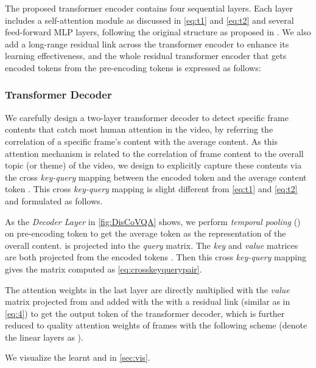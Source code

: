 \documentclass[journal]{IEEEtran}
\begin{document}
The proposed transformer encoder  contains four sequential layers. Each layer includes a self-attention module as discussed in \cref{eq:t1} and \cref{eq:t2} and several feed-forward MLP layers, following the original structure as proposed in \cite{allyouneed}. We also add a long-range residual link across the transformer encoder to enhance its learning effectiveness, and the whole residual transformer encoder that gets encoded tokens  from the pre-encoding tokens   is expressed as follows:









 

\subsubsection{Transformer Decoder} We carefully design a two-layer transformer decoder to detect specific frame contents that catch most human attention in the video, by referring the correlation of a specific frame's content with the average content. As this attention mechanism is related to the correlation of frame content to the overall topic (or theme) of the video, we design to explicitly capture these contents via the cross \textit{key-query} mapping between the encoded token  and the average content token .  This cross \textit{key-query} mapping is slight different from \cref{eq:t1} and \cref{eq:t2} and formulated as follows.



As the \textit{Decoder Layer} in \cref{fig:DisCoVQA} shows, we perform \textit{temporal pooling} () on pre-encoding token to get the average token
 as the representation of the overall content.  is projected into the \textit{query} matrix. The \textit{key} and \textit{value} matrices are both projected from the encoded tokens . Then this cross \textit{key-query} mapping gives the  matrix computed as \cref{eq:crosskeyquerypair}.




The attention weights  in the last layer are directly multiplied with the \textit{value} matrix projected from  and added with the  with a residual link (similar as in \cref{eq:4}) to get the output token  of the transformer decoder, which is further reduced to quality attention weights of frames  with the following scheme (denote the linear layers as ).



We visualize the learnt  and  in \cref{sec:vis}.
\end{document}
